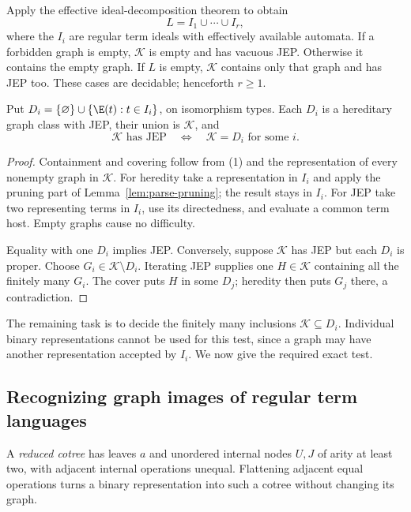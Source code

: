 Apply the effective ideal-decomposition theorem to obtain
\[
                     L=I_1\cup\cdots\cup I_r,                 \tag{1}
\]
where the $I_i$ are regular term ideals with effectively available automata.
If a forbidden graph is empty, $\mathcal K$ is empty and has vacuous JEP.
Otherwise it contains the empty graph. If $L$ is empty, $\mathcal K$
contains only that graph and has JEP too. These cases are decidable;
henceforth $r\geq1$.

\begin{lemma}\label{lem:image-cover}
Put $D_i=\{\varnothing\}\cup\{\E(t):t\in I_i\}$, on isomorphism types.
Each $D_i$ is a hereditary graph class with JEP, their union is
$\mathcal K$, and
\[
 \mathcal K\text{ has JEP}\quad\Longleftrightarrow\quad
                     \mathcal K=D_i\text{ for some }i.        \tag{2}
\]
\end{lemma}
\begin{proof}
Containment and covering follow from (1) and the representation of every
nonempty graph in $\mathcal K$. For heredity take a representation in
$I_i$ and apply the pruning part of Lemma~\ref{lem:parse-pruning}; the
result stays in $I_i$. For JEP take two representing terms in $I_i$,
use its directedness, and evaluate a common term host. Empty graphs cause
no difficulty.

Equality with one $D_i$ implies JEP. Conversely, suppose $\mathcal K$
has JEP but each $D_i$ is proper. Choose $G_i\in\mathcal K\setminus D_i$.
Iterating JEP supplies one $H\in\mathcal K$ containing all the finitely
many $G_i$. The cover puts $H$ in some $D_j$; heredity then puts $G_j$
there, a contradiction.
\end{proof}

The remaining task is to decide the finitely many inclusions
$\mathcal K\subseteq D_i$. Individual binary representations cannot be
used for this test, since a graph may have another representation accepted
by $I_i$. We now give the required exact test.

\subsection{Recognizing graph images of regular term languages}
A \emph{reduced cotree} has leaves $a$ and unordered internal nodes
$U,J$ of arity at least two, with adjacent internal operations unequal.
Flattening adjacent equal operations turns a binary representation into
such a cotree without changing its graph.

